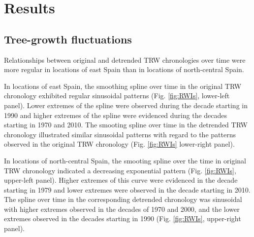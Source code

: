 \documentclass[review,authoryear]{elsarticle}
\begin{document}

\section{Results}

\subsection{Tree-growth fluctuations}
Relationships between original and detrended \gls{TRW} chronologies
over time were more regular in locations of east Spain than in
locations of north-central Spain.

In locations of east Spain, the smoothing spline over time in the
original \gls{TRW} chronology exhibited regular sinusoidal patterns
(Fig. \ref{fig:RWIs}, lower-left panel). Lower extremes of the spline
were observed during the decade starting in 1990 and higher extremes
of the spline were evidenced during the decades starting in 1970 and
2010. The smooting spline over time in the detrended \gls{TRW}
chronology illustrated similar sinusoidal patterns with regard to the
patterns observed in the original \gls{TRW} chronology
(Fig. \ref{fig:RWIs} lower-right panel).

In locations of north-central Spain, the smooting spline over the time
in original \gls{TRW} chronology indicated a decreasing
exponential pattern (Fig. \ref{fig:RWIs}, upper-left panel). Higher
extremes of this curve were evidenced in the decade starting in 1979
and lower extremes were observed in the decade starting in 2010. The
spline over time in the corresponding detrended chronology was
sinusoidal with higher extremes observed in the decades of 1970 and
2000, and the lower extremes observed in the decades starting in 1990
(Fig. \ref{fig:RWIs}, upper-right panel).
\end{document}
